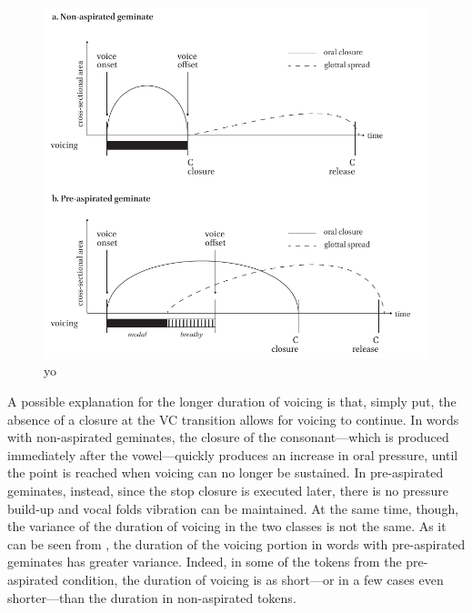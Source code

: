 \documentclass[11pt,a4paper,openany]{memoir}\usepackage[]{graphicx}\usepackage[]{color}
\begin{document}
\begin{figure}
\centering
\includegraphics[width=\textwidth]{reality}
\caption{yo}
\label{f:reality}
\end{figure}

A possible explanation for the longer duration of voicing is that, simply put, the absence of a closure at the VC transition allows for voicing to continue.
In words with non-aspirated geminates, the closure of the consonant---which is produced immediately after the vowel---quickly produces an increase in oral pressure, until the point is reached when voicing can no longer be sustained.
In pre-aspirated geminates, instead, since the stop closure is executed later, there is no pressure build-up and vocal folds vibration can be maintained.
At the same time, though, the variance of the duration of voicing in the two classes is not the same.
As it can be seen from , the duration of the voicing portion in words with pre-aspirated geminates has greater variance.
Indeed, in some of the tokens from the pre-aspirated condition, the duration of voicing is as short---or in a few cases even shorter---than the duration in non-aspirated tokens.
\end{document}
